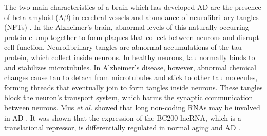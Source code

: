 \documentclass[conference, 11pt]{IEEEtran}
\begin{document}
The two main characteristics of a brain which has developed AD are the presence of beta-amyloid (A$\beta$) in cerebral vessels and abundance of neurofibrillary tangles (NFTs) \cite{deture2019neuropathological}. 
In the Alzheimer’s brain, abnormal levels of this naturally occurring protein clump together to form plaques that collect between neurons and disrupt cell function. 
Neurofibrillary tangles are abnormal accumulations of the tau protein, which collect inside neurons.  
In healthy neurons, tau normally binds to and stabilizes microtubules. 
In Alzheimer’s disease, however, abnormal chemical changes cause tau to detach from microtubules and stick to other tau molecules, forming threads that eventually join to form tangles inside neurons. 
These tangles block the neuron’s transport system, which harms the synaptic communication between neurons\cite{swerdlow2011brain}. 
Mus \emph{et al.} showed that long non-coding RNAs may be involved in AD \cite{mus2007dendritic}. 
It was shown that the expression of the BC200 lncRNA, which is a translational repressor, is differentially regulated in normal aging and AD \cite{mus2007dendritic}. 
\end{document}
